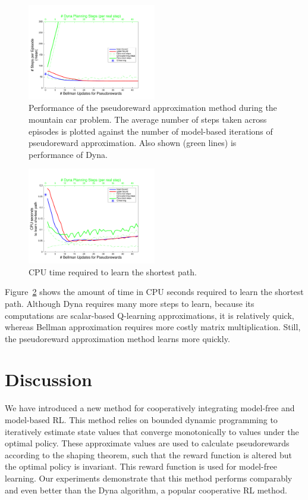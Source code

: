 \documentclass[letterpaper]{article}
\begin{document}
\begin{figure}[t]
\centering
\includegraphics[width=0.5\textwidth]{MC_learning_vs_PRiterations_DYNA_mean}
\caption{Performance of the pseudoreward approximation method during the mountain car problem. The average number of steps taken across episodes is plotted against the number of model-based iterations of pseudoreward approximation. Also shown (green lines) is performance of Dyna.}
\label{fig:mc1}
\end{figure}

\begin{figure}[ht]
\centering
\includegraphics[width=0.5\textwidth]{MC_cpus_vs_PRiterations_DYNA_toGoal}
\caption{CPU time required to learn the shortest path.}
\label{fig:mc2}
\end{figure}

Figure~\ref{fig:mc2} shows the amount of time in CPU seconds required to learn the shortest path. Although Dyna requires many more steps to learn, because its computations are scalar-based Q-learning approximations, it is relatively quick, whereas Bellman approximation requires more costly matrix multiplication. Still, the pseudoreward approximation method learns more quickly.

\section{Discussion}

We have introduced a new method for cooperatively integrating model-free and model-based RL. This method relies on bounded dynamic programming to iteratively estimate state values that converge monotonically to values under the optimal policy. These approximate values are used to calculate pseudorewards according to the shaping theorem, such that the reward function is altered but the optimal policy is invariant. This reward function is used for model-free learning. Our experiments demonstrate that this method performs comparably and even better than the Dyna algorithm, a popular cooperative RL method.
\end{document}
